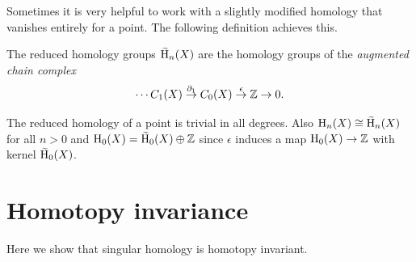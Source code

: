 Sometimes it is very helpful to work with a slightly modified homology that vanishes entirely for a point. The following definition achieves this.

\begin{defn}
    The reduced homology groups $\wt{\rmH}_n(X)$ are the homology groups of the \emph{augmented chain complex}
    \[\cdots C_1(X)\overset{\partial_1}\to C_0(X)\overset{\epsilon}\to \mathbb{Z}\to 0.\]
\end{defn}

The reduced homology of a point is trivial in all degrees. Also $\rmH_n(X)\cong \wt{\rmH}_n(X)$ for all $n>0$ and $\rmH_0(X)=\wt{\rmH}_0(X)\oplus \bbZ$ since $\epsilon$ induces a map $\mathrm{H}_0(X)\to \mathbb{Z}$ with kernel $\wt{\rmH}_0(X)$.




\section{Homotopy invariance}

Here we show that singular homology is homotopy invariant.

